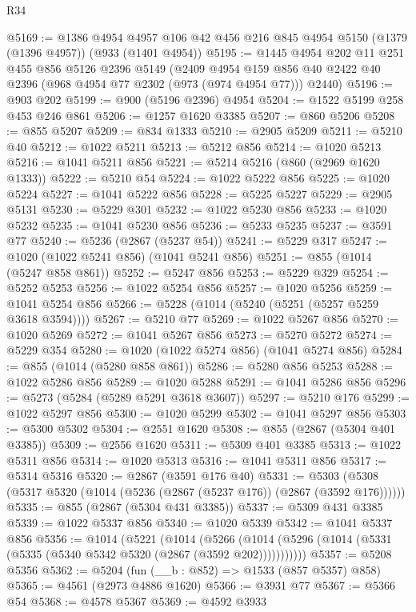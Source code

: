 \begin{lexlean}{R34}
\begin{coremodule}
@5169 := @1386
    @4954
    @4957
    @106
    @42
    @456
    @216
    @845
    @4954
    @5150
    (@1379 (@1396 @4957))
    (@933 (@1401 @4954))
@5195 := @1445
    @4954
    @202
    @11
    @251
    @455
    @856
    @5126
    @2396
    @5149
    (@2409 @4954 @159 @856 @40 @2422 @40 @2396 (@968 @4954 @77 @2302 (@973 (@974 @4954 @77))) @2440)
@5196 := @903 @202
@5199 := @900 (@5196 @2396) @4954
@5204 := @1522 @5199 @258 @453 @246 @861
@5206 := @1257 @1620 @3385
@5207 := @860 @5206
@5208 := @855 @5207
@5209 := @834 @1333
@5210 := @2905 @5209
@5211 := @5210 @40
@5212 := @1022 @5211
@5213 := @5212 @856
@5214 := @1020 @5213
@5216 := @1041 @5211 @856
@5221 := @5214 @5216 (@860 (@2969 @1620 @1333))
@5222 := @5210 @54
@5224 := @1022 @5222 @856
@5225 := @1020 @5224
@5227 := @1041 @5222 @856
@5228 := @5225 @5227
@5229 := @2905 @5131
@5230 := @5229 @301
@5232 := @1022 @5230 @856
@5233 := @1020 @5232
@5235 := @1041 @5230 @856
@5236 := @5233 @5235
@5237 := @3591 @77
@5240 := @5236 (@2867 (@5237 @54))
@5241 := @5229 @317
@5247 := @1020 (@1022 @5241 @856) (@1041 @5241 @856)
@5251 := @855 (@1014 (@5247 @858 @861))
@5252 := @5247 @856
@5253 := @5229 @329
@5254 := @5252 @5253
@5256 := @1022 @5254 @856
@5257 := @1020 @5256
@5259 := @1041 @5254 @856
@5266 := @5228 (@1014 (@5240 (@5251 (@5257 @5259 @3618 @3594))))
@5267 := @5210 @77
@5269 := @1022 @5267 @856
@5270 := @1020 @5269
@5272 := @1041 @5267 @856
@5273 := @5270 @5272
@5274 := @5229 @354
@5280 := @1020 (@1022 @5274 @856) (@1041 @5274 @856)
@5284 := @855 (@1014 (@5280 @858 @861))
@5286 := @5280 @856 @5253
@5288 := @1022 @5286 @856
@5289 := @1020 @5288
@5291 := @1041 @5286 @856
@5296 := @5273 (@5284 (@5289 @5291 @3618 @3607))
@5297 := @5210 @176
@5299 := @1022 @5297 @856
@5300 := @1020 @5299
@5302 := @1041 @5297 @856
@5303 := @5300 @5302
@5304 := @2551 @1620
@5308 := @855 (@2867 (@5304 @401 @3385))
@5309 := @2556 @1620
@5311 := @5309 @401 @3385
@5313 := @1022 @5311 @856
@5314 := @1020 @5313
@5316 := @1041 @5311 @856
@5317 := @5314 @5316
@5320 := @2867 (@3591 @176 @40)
@5331 := @5303 (@5308 (@5317 @5320 (@1014 (@5236 (@2867 (@5237 @176)) (@2867 (@3592 @176))))))
@5335 := @855 (@2867 (@5304 @431 @3385))
@5337 := @5309 @431 @3385
@5339 := @1022 @5337 @856
@5340 := @1020 @5339
@5342 := @1041 @5337 @856
@5356 := @1014
    (@5221
      (@1014
        (@5266 (@1014 (@5296 (@1014 (@5331 (@5335 (@5340 @5342 @5320 (@2867 (@3592 @202)))))))))))
@5357 := @5208 @5356
@5362 := @5204 (fun (__b : @852) => @1533 (@857 @5357) @858)
@5365 := @4561 (@2973 @4886 @1620)
@5366 := @3931 @77
@5367 := @5366 @54
@5368 := @4578 @5367
@5369 := @4592 @3933

\end{coremodule}
\end{lexlean}
